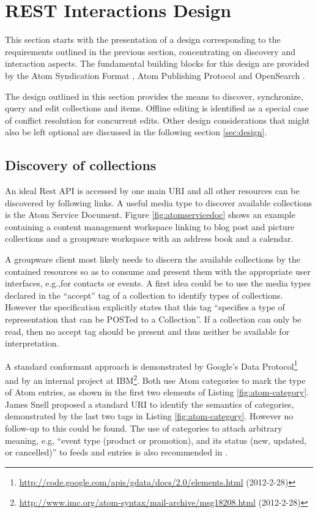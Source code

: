 \documentclass[11pt,a4paper,headsepline,twoside]{scrartcl}		%
\newcommand{\citeurl}[2]{\url{#1} (#2)}
\begin{document}
\section{REST Interactions Design}
\label{sec:interactions}

This section starts with the presentation of a design corresponding to the
requirements outlined in the previous section, concentrating on discovery and
interaction aspects. The fundamental building blocks for this design are
provided by the Atom Syndication Format \cite{RFC4287}, Atom Publishing Protocol
\cite{RFC5023} and OpenSearch \cite{Clinton}.

The design outlined in this section provides the means to discover, synchronize,
query and edit collections and items. Offline editing is identified as a special
case of conflict resolution for concurrent edits. Other design considerations
that might also be left optional are discussed in the following section
\ref{sec:design}.

\subsection{Discovery of collections}
\label{sec:disc-coll}

An ideal Rest API is accessed by one main URI and all other resources can be
discovered by following links. A useful media type to discover available
collections is the Atom Service Document\cite[sec. 8]{RFC5023}. Figure
\ref{fig:atomservicedoc} shows an example containing a content management
workspace linking to blog post and picture collections and a groupware workspace
with an address book and a calendar.

A groupware client most likely needs to discern the available collections by the
contained resources so as to consume and present them with the appropriate user
interfaces, e.g.,for contacts or events. A first idea could be to use the
media types declared in the ``accept'' tag of a collection to identify types of
collections. However the specification explicitly states that this tag
``specifies a type of representation that can be POSTed to a
Collection''\cite[sec. 8.3.4]{RFC5023}. If a collection can only be read, then
no accept tag should be present and thus neither be available for
interpretation.

A standard conformant approach is demonstrated by Google's Data
Protocol\footnote{\citeurl{http://code.google.com/apis/gdata/docs/2.0/elements.html}{2012-2-28}}
and by an internal project at
IBM\footnote{\label{snellatomcategory}\citeurl{http://www.imc.org/atom-syntax/mail-archive/msg18208.html}{2012-2-28}}. Both
use Atom categories\cite[sec. 8.3.6]{RFC5023} to mark the type of Atom entries,
as shown in the first two elements of Listing \ref{fig:atom-category}. James
Snell proposed a standard URI to identify the semantics of
categories, demonstrated by the last two tags in
Listing \ref{fig:atom-category}. However no follow-up to this could be
found. The use of categories to attach arbitrary meaning, e.g, ``event type
(product or promotion), and its status (new, updated, or cancelled)'' to feeds
and entries is also recommended in \cite[p. 200]{Webber2010}.
\end{document}
